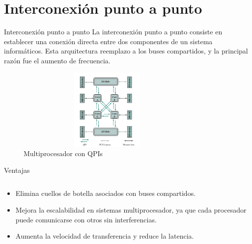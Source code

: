 \documentclass[presentation]{beamer}
\begin{document}
\section{Interconexión punto a punto}
\label{sec:org540d615}
\begin{frame}[label={sec:org2d65c41}]{Interconexión punto a punto}
La interconexión punto a punto consiste en establecer una conexión directa entre dos componentes de un sistema informáticos.
Esta arquitectura reemplazo a los buses compartidos, y la principal razón fue el aumento de frecuencia.

\begin{figure}[!h]
   \vspace{-0.1cm}
   \centering
   \includegraphics[height=4cm, width=0.8\textwidth]{./Images/image1.png}
   \vspace{-0.5cm} %
   \caption{Multiprocesador con QPIs}
   \label{fig:Representacion}
\end{figure}
\end{frame}

\begin{frame}[label={sec:orgf35d509}]{Ventajas}
\begin{columns}
\begin{column}{0.8\columnwidth}
\begin{itemize}
\item Elimina cuellos de botella asociados con buses compartidos.
\item Mejora la escalabilidad en sistemas multiprocesador, ya que cada procesador puede comunicarse con otros sin interferencias.
\item Aumenta la velocidad de transferencia y reduce la latencia.
\end{itemize}
\end{column}
\end{columns}
\end{frame}
\end{document}
